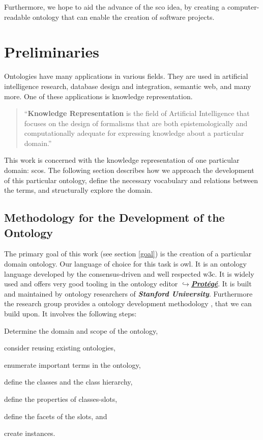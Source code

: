 \documentclass[a4paper, DIV=13, BCOR=0cm]{scrbook}
\newcommand{\pn}[1]{\textit{\textbf{#1}}}
\newcommand{\link}[2]{\href{#1}{$\hookrightarrow$#2}}
\begin{document}
Furthermore, we hope to aid the advance of the \gls{sco} idea, by creating a computer-readable ontology that can enable the creation of software projects.

\chapter{Preliminaries }
Ontologies have many applications in various fields. They are used in artificial intelligence research, database design and integration, semantic web, and many more. \cite[p.\,1]{Gomez-Perez:2004aa} One of these applications is knowledge representation.

\begin{quote}
	\enquote{\textbf{Knowledge Representation} is the field of Artificial Intelligence that focuses on the design of formalisms that are both epistemologically and computationally adequate for expressing knowledge about a particular domain.} \cite[p.\,XV, Preface]{baader2017introduction}
\end{quote}

This work is concerned with the knowledge representation of one particular domain: \glspl{sco}. The following section describes how we approach the development of this particular ontology, define the necessary vocabulary and relations between the terms, and structurally explore the domain.

\section{Methodology for the Development of the Ontology }
The primary goal of this work (see section \ref{goal}) is the creation of a particular domain ontology. Our language of choice for this task is \gls{owl}. It is an ontology language developed by the consensus-driven and well respected \gls{w3c}. \cite[p.\,206]{baader2017introduction} It is widely used and offers very good tooling in the ontology editor \link{https://protege.stanford.edu}{\pn{Protégé}}. It is built and maintained by ontology researchers of \pn{Stanford University}. \cite{musen2015protege} Furthermore the research group provides a ontology development methodology \cite{guide-to-ontology}, that we can build upon. It involves the following steps:
\begin{compactenum}[(1)]
	\item Determine the domain and scope of the ontology,
	\item consider reusing existing ontologies,
	\item enumerate important terms in the ontology,
	\item define the classes and the class hierarchy,
	\item define the properties of classes-slots,
	\item define the facets of the slots, and
	\item create instances.
\end{compactenum}
\end{document}
